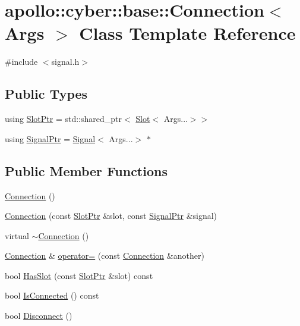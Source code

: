 \hypertarget{classapollo_1_1cyber_1_1base_1_1Connection}{\section{apollo\-:\-:cyber\-:\-:base\-:\-:Connection$<$ Args $>$ Class Template Reference}
\label{classapollo_1_1cyber_1_1base_1_1Connection}
}


{\ttfamily \#include $<$signal.\-h$>$}

\subsection*{Public Types}
\begin{DoxyCompactItemize}
\item 
using \hyperlink{classapollo_1_1cyber_1_1base_1_1Connection_aaa42d1898c38f0d66f1a4883661846ed}{Slot\-Ptr} = std\-::shared\-\_\-ptr$<$ \hyperlink{classapollo_1_1cyber_1_1base_1_1Slot}{Slot}$<$ Args...$>$$>$
\item 
using \hyperlink{classapollo_1_1cyber_1_1base_1_1Connection_a5ce878427399ecea970daa38c90b6de7}{Signal\-Ptr} = \hyperlink{classapollo_1_1cyber_1_1base_1_1Signal}{Signal}$<$ Args...$>$ $\ast$
\end{DoxyCompactItemize}
\subsection*{Public Member Functions}
\begin{DoxyCompactItemize}
\item 
\hyperlink{classapollo_1_1cyber_1_1base_1_1Connection_a39bd124d6ab7e8717ea86d9d150ae7c7}{Connection} ()
\item 
\hyperlink{classapollo_1_1cyber_1_1base_1_1Connection_aa8176d264a079b925d980f1b17c3ad3d}{Connection} (const \hyperlink{classapollo_1_1cyber_1_1base_1_1Connection_aaa42d1898c38f0d66f1a4883661846ed}{Slot\-Ptr} \&slot, const \hyperlink{classapollo_1_1cyber_1_1base_1_1Connection_a5ce878427399ecea970daa38c90b6de7}{Signal\-Ptr} \&signal)
\item 
virtual \hyperlink{classapollo_1_1cyber_1_1base_1_1Connection_a14156ac0d78b9dbb466746588df070b9}{$\sim$\-Connection} ()
\item 
\hyperlink{classapollo_1_1cyber_1_1base_1_1Connection}{Connection} \& \hyperlink{classapollo_1_1cyber_1_1base_1_1Connection_ac73ebb2dae4b6a709eefbd8d0fc43d23}{operator=} (const \hyperlink{classapollo_1_1cyber_1_1base_1_1Connection}{Connection} \&another)
\item 
bool \hyperlink{classapollo_1_1cyber_1_1base_1_1Connection_ab72af6dc33a506fd425a0163d94fdef3}{Has\-Slot} (const \hyperlink{classapollo_1_1cyber_1_1base_1_1Connection_aaa42d1898c38f0d66f1a4883661846ed}{Slot\-Ptr} \&slot) const 
\item 
bool \hyperlink{classapollo_1_1cyber_1_1base_1_1Connection_a181583a49cabf998ba2cc5d1584ba417}{Is\-Connected} () const 
\item 
bool \hyperlink{classapollo_1_1cyber_1_1base_1_1Connection_ab727adacf368b3fd3f8991d7b1405729}{Disconnect} ()
\end{DoxyCompactItemize}
